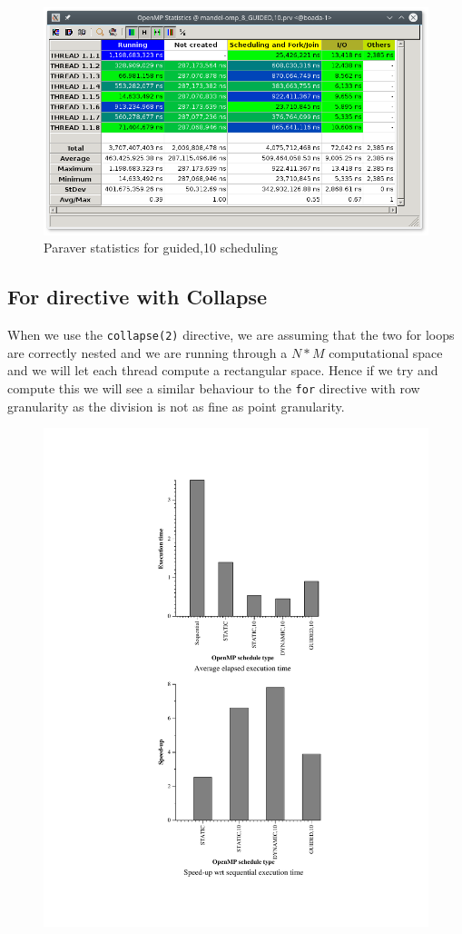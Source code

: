 \documentclass[11pt]{article}
\begin{document}
\begin{figure}[!htb]
  \centerline{\includegraphics[width=0.9\linewidth]{./For/Paraver/guided.png}}
    \caption{Paraver statistics for guided,10 scheduling}
\end{figure}

\FloatBarrier
\subsection{For directive with Collapse}
When we use the \texttt{collapse(2)} directive, we are assuming that the two for loops are correctly nested and we are running through a \(N*M\) computational space and we will let each thread compute a rectangular space. Hence if we try and compute this we will see a similar behaviour to the \texttt{for} directive with row granularity as the division is not as fine as point granularity.

\begin{figure}[!htb]
  \centerline{\includegraphics[width=0.9\linewidth]{./For/Collapse/collapse.pdf}}
\end{figure}
\end{document}
